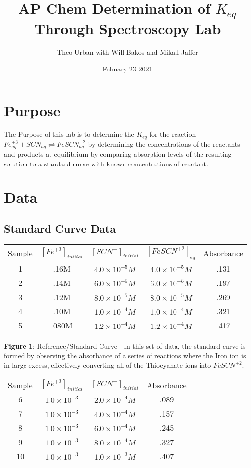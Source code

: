 \documentclass{article}
\title{AP Chem Determination of $K_{eq}$ Through Spectroscopy Lab}
\author{Theo Urban with Will Bakos and Mikail Jaffer}
\date{Febuary 23 2021}
\begin{document}
\maketitle

\section{Purpose}
    The Purpose of this lab is to determine the $K_{eq}$ for the reaction $Fe^{+3}_{aq} + SCN^-_{aq} \rightleftharpoons FeSCN^{+2}_{aq}$ by determining the concentrations of the reactants and products at equilibrium by comparing absorption levels of the resulting solution to a standard curve with known concentrations of reactant.
\section{Data}
\subsection{Standard Curve Data}
\begin{table}[h!]
\centering
    \begin{tabular}{c|c|c|c|c}
        Sample & $[Fe^{+3}]_{initial}$ & $[SCN^-]_{initial}$ & $[FeSCN^{+2}]_{eq}$ & Absorbance \\
        1 & .16M & $4.0\times10^{-5}M$ & $4.0\times10^{-5}M$ & .131 \\
        2 & .14M & $6.0\times10^{-5}M$ & $6.0\times10^{-5}M$ & .197 \\
        3 & .12M & $8.0\times10^{-5}M$ & $8.0\times10^{-5}M$ & .269 \\
        4 & .10M & $1.0\times10^{-4}M$ & $1.0\times10^{-4}M$ & .321 \\
        5 & .080M & $1.2\times10^{-4}M$ & $1.2\times10^{-4}M$ & .417
    
    \end{tabular}
\end{table}
\centering
\textbf{Figure 1}: Reference/Standard Curve - In this set of data, the standard curve is formed by observing the absorbance of a series of reactions where the Iron ion is in large excess, effectively converting all of the Thiocyanate ions into $FeSCN^{+2}$.
$\ $ 

\begin{table}[h!]
    \centering
    \begin{tabular}{c|c|c|c}
        Sample & $[Fe^{+3}]_{initial}$ & $[SCN^-]_{initial}$ & Absorbance \\
        6 & $1.0\times10^{-3}$ & $2.0\times10^{-4}M$ & .089 \\
        7 & $1.0\times10^{-3}$ & $4.0\times10^{-4}M$ & .157 \\
        8 & $1.0\times10^{-3}$ & $6.0\times10^{-4}M$ & .245 \\
        9 & $1.0\times10^{-3}$ & $8.0\times10^{-4}M$ & .327 \\
        10 & $1.0\times10^{-3}$ & $1.0\times10^{-3}M$ & .407 
    \end{tabular}
\end{table}
\end{document}
